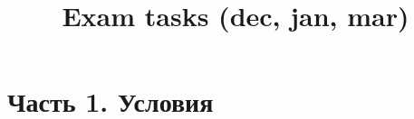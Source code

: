 
\usepackage[T2A]{fontenc}
\usepackage[utf8]{inputenc}
\usepackage[russian,english]{babel}
\usepackage{amsmath,amssymb,amsfonts}
\usepackage[a4paper,margin=2.2cm]{geometry}
\usepackage{enumitem}
\newcommand{\OPENNEGINF}{(-\infty}
\newcommand{\OPENPOSINF}{(+\infty}
\newcommand{\NEGINFTAIL}{-\infty}
\newcommand{\PLUSINFTAIL}{+\infty}
\title{Exam tasks (dec, jan, mar)}
\date{}

\maketitle

\section*{Часть 1. Условия}

